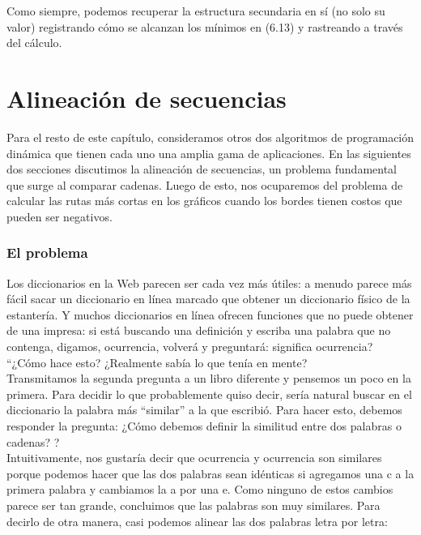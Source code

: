 \documentclass[a4paper, 12pt]{book}
\theoremstyle{dotless}
\begin{document}
Como siempre, podemos recuperar la estructura secundaria en sí (no solo su valor) registrando cómo se alcanzan los mínimos en (6.13) y rastreando a través del cálculo.\\

\section{Alineación de secuencias}

Para el resto de este capítulo, consideramos otros dos algoritmos de programación dinámica que tienen cada uno una amplia gama de aplicaciones. En las siguientes dos secciones discutimos la alineación de secuencias, un problema fundamental que surge al comparar cadenas. Luego de esto, nos ocuparemos del problema de calcular las rutas más cortas en los gráficos cuando los bordes tienen costos que pueden ser negativos.\\

\subsubsection*{El problema}

Los diccionarios en la Web parecen ser cada vez más útiles: a menudo parece más fácil sacar un diccionario en línea marcado que obtener un diccionario físico de la estantería. Y muchos diccionarios en línea ofrecen funciones que no puede obtener de una impresa: si está buscando una definición y escriba una palabra que no contenga, digamos, ocurrencia, volverá y preguntará: significa ocurrencia? ``¿Cómo hace esto? ¿Realmente sabía lo que tenía en mente?\\

Transmitamos la segunda pregunta a un libro diferente y pensemos un poco en la primera. Para decidir lo que probablemente quiso decir, sería natural buscar en el diccionario la palabra más ``similar'' a la que escribió. Para hacer esto, debemos responder la pregunta: ¿Cómo debemos definir la similitud entre dos palabras o cadenas? ?\\

Intuitivamente, nos gustaría decir que ocurrencia y ocurrencia son similares porque podemos hacer que las dos palabras sean idénticas si agregamos una c a la primera palabra y cambiamos la a por una e. Como ninguno de estos cambios parece ser tan grande, concluimos que las palabras son muy similares. Para decirlo de otra manera, casi podemos alinear las dos palabras letra por letra:\\
\end{document}
